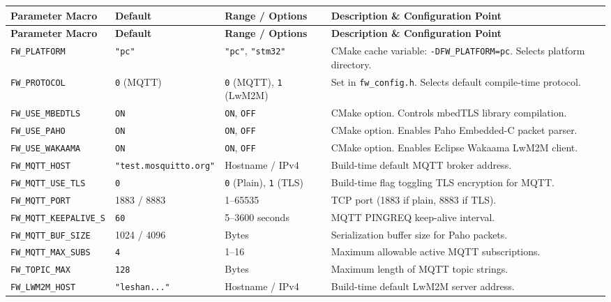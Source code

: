 \documentclass[11pt,a4paper]{article}
\newcommand{\code}[1]{\texttt{#1}}
\begin{document}
\begin{longtable}{p{4.5cm} p{2.2cm} p{3.5cm} p{5cm}}
\toprule
\textbf{Parameter Macro} & \textbf{Default} & \textbf{Range / Options} & \textbf{Description \& Configuration Point} \\
\midrule
\endfirsthead
\toprule
\textbf{Parameter Macro} & \textbf{Default} & \textbf{Range / Options} & \textbf{Description \& Configuration Point} \\
\midrule
\endhead
\bottomrule
\endfoot
\code{FW\_PLATFORM} & \code{"pc"} & \code{"pc"}, \code{"stm32"} & CMake cache variable: \code{-DFW\_PLATFORM=pc}. Selects platform directory. \\
\addlinespace
\code{FW\_PROTOCOL} & \code{0} (MQTT) & \code{0} (MQTT), \code{1} (LwM2M) & Set in \code{fw\_config.h}. Selects default compile-time protocol. \\
\addlinespace
\code{FW\_USE\_MBEDTLS} & \code{ON} & \code{ON}, \code{OFF} & CMake option. Controls mbedTLS library compilation. \\
\addlinespace
\code{FW\_USE\_PAHO} & \code{ON} & \code{ON}, \code{OFF} & CMake option. Enables Paho Embedded-C packet parser. \\
\addlinespace
\code{FW\_USE\_WAKAAMA} & \code{ON} & \code{ON}, \code{OFF} & CMake option. Enables Eclipse Wakaama LwM2M client. \\
\addlinespace
\code{FW\_MQTT\_HOST} & \code{"test.mosquitto.org"} & Hostname / IPv4 & Build-time default MQTT broker address. \\
\addlinespace
\code{FW\_MQTT\_USE\_TLS} & \code{0} & \code{0} (Plain), \code{1} (TLS) & Build-time flag toggling TLS encryption for MQTT. \\
\addlinespace
\code{FW\_MQTT\_PORT} & 1883 / 8883 & 1--65535 & TCP port (1883 if plain, 8883 if TLS). \\
\addlinespace
\code{FW\_MQTT\_KEEPALIVE\_S}& \code{60} & 5--3600 seconds & MQTT PINGREQ keep-alive interval. \\
\addlinespace
\code{FW\_MQTT\_BUF\_SIZE} & 1024 / 4096 & Bytes & Serialization buffer size for Paho packets. \\
\addlinespace
\code{FW\_MQTT\_MAX\_SUBS} & \code{4} & 1--16 & Maximum allowable active MQTT subscriptions. \\
\addlinespace
\code{FW\_TOPIC\_MAX} & \code{128} & Bytes & Maximum length of MQTT topic strings. \\
\addlinespace
\code{FW\_LWM2M\_HOST} & \code{"leshan..."} & Hostname / IPv4 & Build-time default LwM2M server address. \\

\end{longtable}
\end{document}
